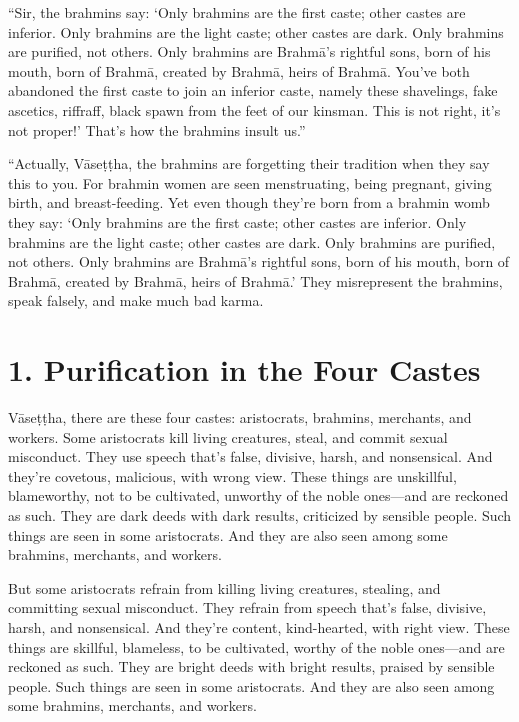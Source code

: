 \documentclass[12pt,openany]{book}%
\begin{document}
“Sir, the brahmins say: ‘Only brahmins are the first caste; other castes are inferior. Only brahmins are the light caste; other castes are dark. Only brahmins are purified, not others. Only brahmins are \textsanskrit{Brahmā}’s rightful sons, born of his mouth, born of \textsanskrit{Brahmā}, created by \textsanskrit{Brahmā}, heirs of \textsanskrit{Brahmā}. You’ve both abandoned the first caste to join an inferior caste, namely these shavelings, fake ascetics, riffraff, black spawn from the feet of our kinsman. This is not right, it’s not proper!’ That’s how the brahmins insult us.” 

“Actually, \textsanskrit{Vāseṭṭha}, the brahmins are forgetting their tradition when they say this to you. For brahmin women are seen menstruating, being pregnant, giving birth, and breast-feeding. Yet even though they’re born from a brahmin womb they say: ‘Only brahmins are the first caste; other castes are inferior. Only brahmins are the light caste; other castes are dark. Only brahmins are purified, not others. Only brahmins are \textsanskrit{Brahmā}’s rightful sons, born of his mouth, born of \textsanskrit{Brahmā}, created by \textsanskrit{Brahmā}, heirs of \textsanskrit{Brahmā}.’ They misrepresent the brahmins, speak falsely, and make much bad karma. 

\section*{1. Purification in the Four Castes }

\textsanskrit{Vāseṭṭha}, there are these four castes: aristocrats, brahmins, merchants, and workers. Some aristocrats kill living creatures, steal, and commit sexual misconduct. They use speech that’s false, divisive, harsh, and nonsensical. And they’re covetous, malicious, with wrong view. These things are unskillful, blameworthy, not to be cultivated, unworthy of the noble ones—and are reckoned as such. They are dark deeds with dark results, criticized by sensible people. Such things are seen in some aristocrats. And they are also seen among some brahmins, merchants, and workers. 

But some aristocrats refrain from killing living creatures, stealing, and committing sexual misconduct. They refrain from speech that’s false, divisive, harsh, and nonsensical. And they’re content, kind-hearted, with right view. These things are skillful, blameless, to be cultivated, worthy of the noble ones—and are reckoned as such. They are bright deeds with bright results, praised by sensible people. Such things are seen in some aristocrats. And they are also seen among some brahmins, merchants, and workers. 
\end{document}
